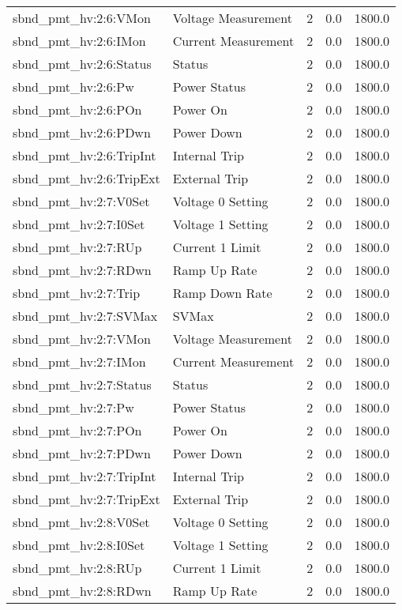 \begin{center}
\begin{longtable}{l | l l l l }
sbnd\_pmt\_hv:2:6:VMon & Voltage Measurement & 2 & 0.0 & 1800.0\\ 
sbnd\_pmt\_hv:2:6:IMon & Current Measurement & 2 & 0.0 & 1800.0\\ 
sbnd\_pmt\_hv:2:6:Status & Status & 2 & 0.0 & 1800.0\\ 
sbnd\_pmt\_hv:2:6:Pw & Power Status & 2 & 0.0 & 1800.0\\ 
sbnd\_pmt\_hv:2:6:POn & Power On & 2 & 0.0 & 1800.0\\ 
sbnd\_pmt\_hv:2:6:PDwn & Power Down & 2 & 0.0 & 1800.0\\ 
sbnd\_pmt\_hv:2:6:TripInt & Internal Trip & 2 & 0.0 & 1800.0\\ 
sbnd\_pmt\_hv:2:6:TripExt & External Trip & 2 & 0.0 & 1800.0\\ 
sbnd\_pmt\_hv:2:7:V0Set & Voltage 0 Setting & 2 & 0.0 & 1800.0\\ 
sbnd\_pmt\_hv:2:7:I0Set & Voltage 1 Setting & 2 & 0.0 & 1800.0\\ 
sbnd\_pmt\_hv:2:7:RUp & Current 1 Limit & 2 & 0.0 & 1800.0\\ 
sbnd\_pmt\_hv:2:7:RDwn & Ramp Up Rate & 2 & 0.0 & 1800.0\\ 
sbnd\_pmt\_hv:2:7:Trip & Ramp Down Rate & 2 & 0.0 & 1800.0\\ 
sbnd\_pmt\_hv:2:7:SVMax & SVMax & 2 & 0.0 & 1800.0\\ 
sbnd\_pmt\_hv:2:7:VMon & Voltage Measurement & 2 & 0.0 & 1800.0\\ 
sbnd\_pmt\_hv:2:7:IMon & Current Measurement & 2 & 0.0 & 1800.0\\ 
sbnd\_pmt\_hv:2:7:Status & Status & 2 & 0.0 & 1800.0\\ 
sbnd\_pmt\_hv:2:7:Pw & Power Status & 2 & 0.0 & 1800.0\\ 
sbnd\_pmt\_hv:2:7:POn & Power On & 2 & 0.0 & 1800.0\\ 
sbnd\_pmt\_hv:2:7:PDwn & Power Down & 2 & 0.0 & 1800.0\\ 
sbnd\_pmt\_hv:2:7:TripInt & Internal Trip & 2 & 0.0 & 1800.0\\ 
sbnd\_pmt\_hv:2:7:TripExt & External Trip & 2 & 0.0 & 1800.0\\ 
sbnd\_pmt\_hv:2:8:V0Set & Voltage 0 Setting & 2 & 0.0 & 1800.0\\ 
sbnd\_pmt\_hv:2:8:I0Set & Voltage 1 Setting & 2 & 0.0 & 1800.0\\ 
sbnd\_pmt\_hv:2:8:RUp & Current 1 Limit & 2 & 0.0 & 1800.0\\ 
sbnd\_pmt\_hv:2:8:RDwn & Ramp Up Rate & 2 & 0.0 & 1800.0\\ 

\end{longtable}
\end{center}
